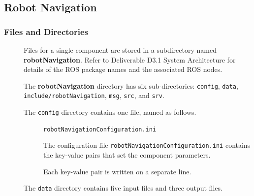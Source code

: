 \documentclass{CSSRforAfrica}
\newcommand{\checkboxChecked}{\fbox{\ding{51}}} %
\begin{document}
\subsection{Robot Navigation}

\subsubsection{Files and Directories}

\begin{description}

\item[\checkboxChecked] Files for a single component are stored in a subdirectory named \textbf{robotNavigation}. Refer to Deliverable D3.1 System Architecture for details of the ROS package names and the associated ROS nodes.

\item[\checkboxChecked] The \textbf{robotNavigation} directory has six sub-directories: {\small \verb+config+},   {\small \verb+data+},   {\small \verb+include/robotNavigation+}, {\small \verb+msg+},  {\small \verb+src+}, and {\small \verb+srv+}.

\item[\checkboxChecked] The  {\small \verb+config+} directory contains one file, named as follows.

\begin{description}
\item[\checkboxChecked] {\small \verb+robotNavigationConfiguration.ini+}  
\item[\checkboxChecked] The configuration file {\small \verb+robotNavigationConfiguration.ini+} contains the key-value pairs that set the component parameters.  
\item[\checkboxChecked] Each key-value pair is written on a separate line.
\end{description} 


\item[\checkboxChecked] The  {\small \texttt{data}} directory contains five input files and three output files.


\end{description}
\end{document}
